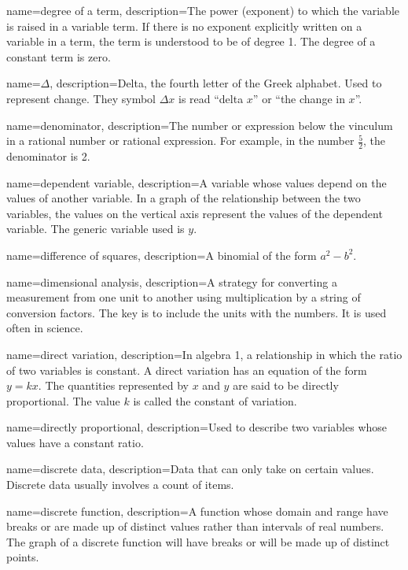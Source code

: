  {
	name=degree of a term,
	description={The power (exponent) to which the variable is raised in a variable term. If there is no exponent explicitly written on a variable in a term, the term is understood to be of degree 1. The degree of a constant term is zero.}
}

{
	name={$\Delta$},
	description={Delta, the fourth letter of the Greek alphabet. Used to represent change. They symbol $\Delta x$ is read ``delta $x$'' or ``the change in $x$''.}
}

 {
	name=denominator,
	description={The number or expression below the \gls{vinculum} in a \gls{rational number} or \gls{rational expression}. For example, in the number $\frac{5}{2}$, the denominator is 2.}
}

 {
	name=dependent variable,
	description={A variable whose values depend on the values of another variable. In a graph of the relationship between the two variables, the values on the vertical axis represent the values of the dependent variable. The generic variable used is $y$.}
}

 {
	name=difference of squares,
	description={A binomial of the form $a^2-b^2$.}
}

 {
	name=dimensional analysis,
	description={A strategy for converting a measurement from one unit to another using multiplication by a string of conversion factors. The key is to include the units with the numbers. It is used often in science.}
}

 {
	name=direct variation,
	description={In algebra 1, a relationship in which the ratio of two variables is constant. A direct variation has an equation of the form $y = kx$. The quantities represented by $x$ and $y$ are said to be \gls{directly proportional}. The value $k$ is called the \gls{constant of variation}.}
}

 {
	name=directly proportional,
	description={Used to describe two variables whose values have a constant ratio.}
}

 {
	name=discrete data,
	description={Data that can only take on certain values. Discrete data usually involves a count of items.}
}

 {
	name=discrete function,
	description={A function whose domain and range have breaks or are made up of distinct values rather than intervals of real numbers. The graph of a discrete function will have breaks or will be made up of distinct points.}
}

